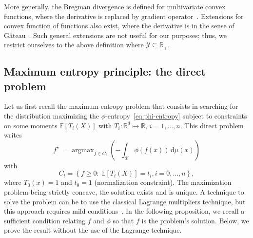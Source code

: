\documentclass[entropy,article,submit,moreauthors,pdftex]{Definitions/mdpi}
\def\dmu{\mathrm{d}\mu}
\def\Rset{\mathbb{R}}
\def\X{\mathcal{X}}
\def\Y{\mathcal{Y}}
\DeclareMathOperator*{\argmax}{\operatorname{argmax}}
\newcommand{\Esp}[1]{\mathbb{E}\left[ #1 \right]}
\begin{document}
More  generally,  the Bregman  divergence  is  defined for  multivariate  convex
functions,     where    the     derivative    is     replaced    by     gradient
operator~\cite{Bre67}. Extensions  for convex function of  functions also exist,
where the derivative  is in the sense of  G\^ateau~\cite{NieNoc17}. Such general
extensions are not  useful for our purposes; thus, we  restrict ourselves to the
above definition where $\Y \subseteq \Rset_+$.




\subsection{Maximum entropy principle: the direct problem}

Let us first  recall the maximum entropy problem that  consists in searching for
the distribution maximizing the $\phi$-entropy~\eqref{eq:phi-entropy} subject to
constraints on  some moments $\Esp{T_i(X)}$  with $T_i: \Rset^d  \mapsto \Rset$,
$i=1,\ldots,n$. This direct problem writes
%
\begin{equation}\label{eq:MaxEnt}
\displaystyle f^\star \: = \argmax_{f \in C_t} \left( - \int_\X \phi(f(x)) \,
\dmu(x) \right)
\end{equation}
%
with
%
\begin{equation}\label{eq:Ct}
C_t = \left\{ f \ge 0: \: \Esp{T_i(X)} = t_i, i=0,\ldots,n\right\},
\end{equation}
%
where $T_0(x) =  1$ and $t_0 = 1$ (normalization  constraint).  The maximization
problem being strictly  concave, the solution exists and is  unique. A technique
to solve the problem can be to use the classical Lagrange multipliers technique,
but   this  approach   requires  mild   conditions~\cite{KesKap89,  BorLew91:03,
  BorLew93, BenBor92, TebVaj93, Gir97}. In  the following proposition, we recall
a sufficient  condition relating  $f$ and  $\phi$ so that  $f$ is  the problem's
solution. Below, we prove the result without the use of the Lagrange technique.
\end{document}
